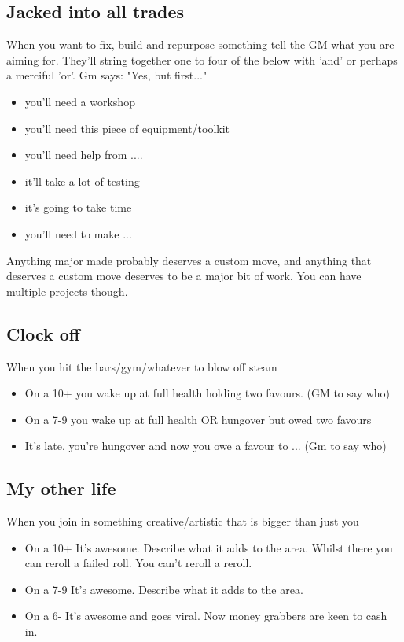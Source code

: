 \documentclass{tufte-book}
\begin{document}
\subsection{Jacked into all trades}
When you want to fix, build and repurpose something tell the GM what you are aiming for. They'll string together one to four of the below with 'and' or perhaps a merciful 'or'.
Gm says: "Yes, but first..."
\begin{itemize}
\item you'll need a workshop
\item you'll need this piece of equipment/toolkit
\item you'll need help from ....
\item it'll take a lot of testing
\item it's going to take time
\item you'll need to make ...
\end{itemize}
Anything major made probably deserves a custom move, and anything that deserves a custom move deserves to be a major bit of work. You can have multiple projects though.

\subsection{Clock off}
When you hit the bars/gym/whatever to blow off steam 
\begin{itemize}
\item On a 10+ you wake up at full health holding two favours. (GM to say who)
\item On a 7-9 you wake up at full health OR hungover but owed two favours
\item It's late, you're hungover and now you owe a favour to ... (Gm to say who)
\end{itemize}

\subsection{My other life}
When you join in something creative/artistic that is bigger than just you 
\begin{itemize}
\item On a 10+ It's awesome. Describe what it adds to the area. Whilst there you can reroll a failed roll. You can't reroll a reroll.
\item On a 7-9 It's awesome. Describe what it adds to the area.
\item On a 6- It's awesome and goes viral. Now money grabbers are keen to cash in.
\end{itemize}
\end{document}
